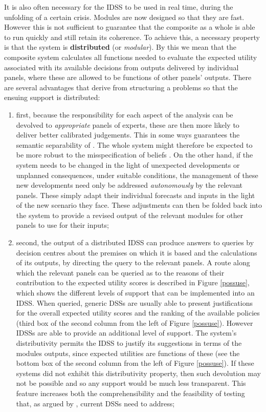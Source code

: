 It is also often necessary for the IDSS to be used in real time, during the unfolding of a certain crisis. Modules are now designed so that they are fast. However this is not sufficient to guarantee that the composite as a whole is able to run quickly and still retain its coherence. To achieve this, a necessary property is that the system is \textbf{distributed} (or \textit{modular}). By this we mean that the composite system calculates all functions needed to evaluate the expected utility associated with its available decisions from outputs delivered by individual panels, where these are allowed to be functions of other panels' outputs. There are several advantages that derive from structuring a problems so that the ensuing support is distributed:
\begin{enumerate}
\item first, because the responsibility for each aspect of the analysis can be devolved to \textit{appropriate} panels of experts, these are then more likely to deliver better calibrated judgements.  This in some ways guarantees the semantic separability of \citet{Mahoney1996}. The whole system might therefore be expected to be more robust to the misspecification of beliefs \citep{Cooke1991a}. On the other hand, if the system needs to be changed in the light of unexpected developments or unplanned consequences, under suitable conditions, the management of these new developments need only be addressed \textit{autonomously} by the relevant panels. These simply adapt their individual forecasts and inputs in the light of the new scenario they face. These adjustments can then be folded back into the system to provide  a revised output of the relevant modules for other panels to use for their inputs;
\item second, the output of a distributed IDSS can produce answers to queries by decision centres about the premises on which it is based and the calculations of its outputs, by directing the query to the relevant panels. A route along which the relevant panels can be queried as to the reasons of their contribution to the expected utility scores is described in Figure \ref{possuse}, which shows the different levels of support that can be implemented into an IDSS. When queried, generic DSSs are usually able to present justifications for the overall expected utility scores and the ranking of the available policies (third box of the second column from the left of Figure \ref{possuse}). However IDSSs are able to provide an additional level of support. The system's distributivity permits the IDSS to justify its suggestions in terms of the modules outputs, since expected utilities are functions of these (see the bottom box of the second column from the left of Figure \ref{possuse}). If these systems did not exhibit this distributivity property, then such devolution may not be possible and so any support would be much less transparent. This feature increases both the comprehensibility and the feasibility of testing that, as argued by \citet{Mahoney1996}, current DSSs need to address;

\end{enumerate}
